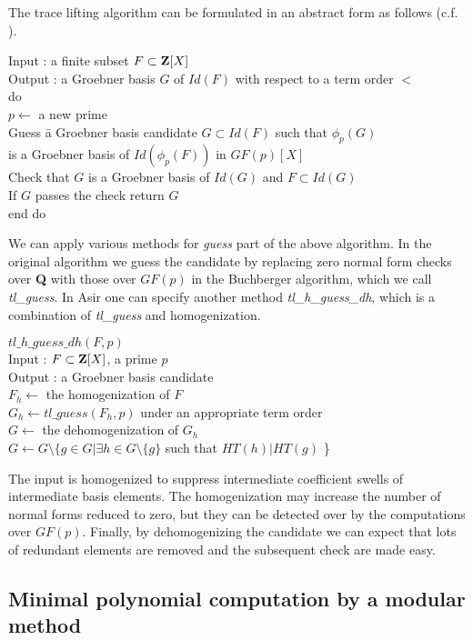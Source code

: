 \documentclass[runningheads]{cl2emult}
\begin{document}
The trace lifting algorithm can be
formulated in an abstract form as follows (c.f. \cite{noro:FPARA}).
\begin{tabbing}
Input : a finite subset $F \subset {\bf Z}[X]$\\
Output : a Groebner basis $G$ of $Id(F)$ with respect to a term order $<$\\
do \= \\
\> $p \leftarrow$ a new prime\\
\>Guess \= a Groebner basis candidate $G \subset Id(F)$ 
such that $\phi_p(G)$ \\
\>\> is a Groebner basis of $Id(\phi_p(F))$ in ${GF(p)}[X]$\\
\>Check that $G$ is a Groebner basis of $Id(G)$ and $F \subset Id(G)$\\
\>If $G$ passes the check return $G$\\
end do
\end{tabbing}
We can apply various methods for {\it guess} part of the above
algorithm.  In the original algorithm we guess the candidate by
replacing zero normal form checks over {\bf Q} with those over $GF(p)$
in the Buchberger algorithm, which we call {\it tl\_guess}. In Asir
one can specify another method {\it tl\_h\_guess\_dh}, which is a
combination of {\it tl\_guess} and homogenization.
\begin{tabbing}
$tl\_h\_guess\_dh(F,p)$\\
Input : $F\subset {\bf Z}[X]$, a prime $p$\\
Output : a Groebner basis candidate\\
$F_h \leftarrow$ the homogenization of $F$\\
$G_h \leftarrow tl\_guess(F_h,p)$ under an appropriate term order\\
$G \leftarrow$ the dehomogenization of $G_h$\\
$G \leftarrow G \setminus \{g \in G| \exists h \in G \setminus \{g\}$
such that $HT(h)|HT(g)$ \}
\end{tabbing}
The input is homogenized to suppress intermediate coefficient swells
of intermediate basis elements.  The homogenization may increase the
number of normal forms reduced to zero, but they can be
detected over by the computations over $GF(p)$. Finally, by
dehomogenizing the candidate we can expect that lots of redundant
elements are removed and the subsequent check are made easy.

\subsection{Minimal polynomial computation by a modular method}
\end{document}
